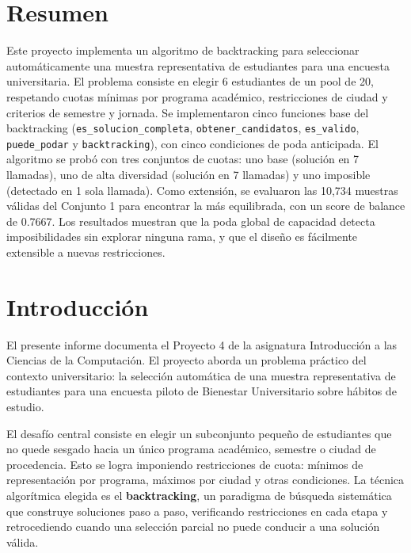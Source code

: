 \documentclass[12pt, a4paper]{article}
\begin{document}
\tableofcontents
\newpage

\section*{Resumen}

Este proyecto implementa un algoritmo de backtracking para seleccionar automáticamente una muestra representativa de estudiantes para una encuesta universitaria. El problema consiste en elegir 6 estudiantes de un pool de 20, respetando cuotas mínimas por programa académico, restricciones de ciudad y criterios de semestre y jornada. Se implementaron cinco funciones base del backtracking (\texttt{es\_solucion\_completa}, \texttt{obtener\_candidatos}, \texttt{es\_valido}, \texttt{puede\_podar} y \texttt{backtracking}), con cinco condiciones de poda anticipada. El algoritmo se probó con tres conjuntos de cuotas: uno base (solución en 7 llamadas), uno de alta diversidad (solución en 7 llamadas) y uno imposible (detectado en 1 sola llamada). Como extensión, se evaluaron las 10,734 muestras válidas del Conjunto 1 para encontrar la más equilibrada, con un score de balance de 0.7667. Los resultados muestran que la poda global de capacidad detecta imposibilidades sin explorar ninguna rama, y que el diseño es fácilmente extensible a nuevas restricciones.

\newpage

\section{Introducción}

El presente informe documenta el Proyecto 4 de la asignatura Introducción a las Ciencias de la Computación. El proyecto aborda un problema práctico del contexto universitario: la selección automática de una muestra representativa de estudiantes para una encuesta piloto de Bienestar Universitario sobre hábitos de estudio.

El desafío central consiste en elegir un subconjunto pequeño de estudiantes que no quede sesgado hacia un único programa académico, semestre o ciudad de procedencia. Esto se logra imponiendo restricciones de cuota: mínimos de representación por programa, máximos por ciudad y otras condiciones. La técnica algorítmica elegida es el \textbf{backtracking}, un paradigma de búsqueda sistemática que construye soluciones paso a paso, verificando restricciones en cada etapa y retrocediendo cuando una selección parcial no puede conducir a una solución válida.
\end{document}
